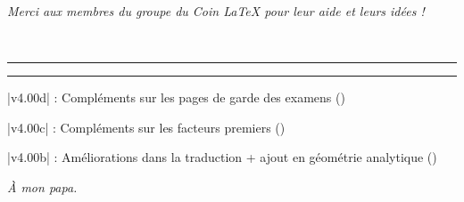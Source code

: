 \hfill{}\textsl{Merci aux membres du groupe \faFacebook{} du \og Coin \LaTeX{} \fg{} pour leur aide et leurs idées !}

~

\vfill

\hrule

\medskip

\TableauDocumentation

\medskip

\hrule

\vfill

{\small \bverb|v4.00d| : Compléments sur les pages de garde des examens (\pageref{pagegardebac})}

{\small \bverb|v4.00c| : Compléments sur les facteurs premiers (\pageref{facteurspremiers})}

{\small \bverb|v4.00b| : Améliorations dans la traduction + ajout en géométrie analytique (\pageref{eqsphere})}




\vfill

\hfill{\footnotesize\sffamily\itshape À mon papa.}